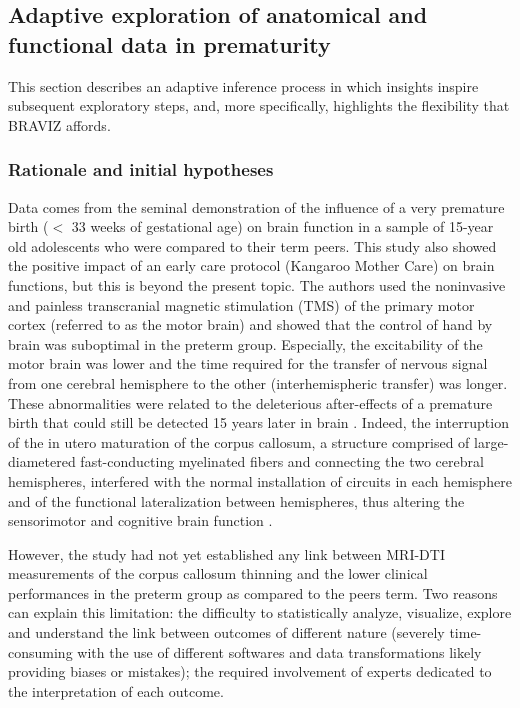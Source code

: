 \documentclass{frontiersHLTH}
\begin{document}
 
\subsection{Adaptive exploration of anatomical and functional data in prematurity}
\label{sec_case_cyril}

This section describes an adaptive inference process in which insights inspire subsequent exploratory steps, and, more specifically, highlights the flexibility that BRAVIZ affords.

\subsubsection{Rationale and initial hypotheses}

Data comes from the seminal demonstration \cite{schneider_cerebral_2012} of the influence of a very premature birth ($<$ 33 weeks of gestational age) on brain function in a sample of 15-year old adolescents who were compared to their term peers. This study also showed the positive impact of an early care protocol (Kangaroo Mother Care) on brain functions, but this is beyond the present topic. The authors used the noninvasive and painless transcranial magnetic stimulation (TMS) of the primary motor cortex (referred to as the motor brain) and showed that the control of hand by brain was suboptimal in the preterm group. Especially, the excitability of the motor brain was lower and the time required for the transfer of nervous signal from one cerebral hemisphere to the other (interhemispheric transfer) was longer. These abnormalities were related to the deleterious after-effects of a premature birth that could still be detected 15 years later in brain  \cite{schneider_cerebral_2012}. Indeed, the interruption of the in utero maturation of the corpus callosum, a structure comprised of large-diametered fast-conducting myelinated fibers and connecting the two cerebral hemispheres, interfered with the normal installation of circuits in each hemisphere and of the functional lateralization between hemispheres, thus altering the sensorimotor and cognitive brain function \cite{schneider_cerebral_2012, schneider_visuo-motor_2008, flamand_brain_2012}.

However, the study had not yet established any link between MRI-DTI measurements of the corpus callosum thinning and the lower clinical performances in the preterm group as compared to the peers term. Two reasons can explain this limitation:  the difficulty to statistically analyze, visualize, explore and understand the link between outcomes of different nature (severely time-consuming with the use of different softwares and data transformations likely providing biases or mistakes); the required involvement of experts dedicated to the interpretation of each outcome.
\end{document}
